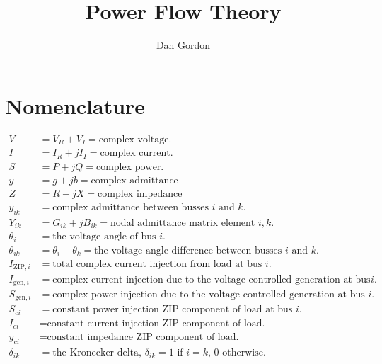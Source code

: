 \documentclass[11pt]{article}
\title{Power Flow Theory}
\author{Dan Gordon}
\date{}
\newcommand{\Vr}{{V_R}}
\newcommand{\Vi}{{V_I}}
\newcommand{\Ir}{{I_R}}
\newcommand{\Ii}{{I_I}}
\begin{document}
\maketitle

\section{Nomenclature}
\begin{align*}
V &= \Vr + \Vi = \text{complex voltage.} \\
I &= \Ir + j\Ii = \text{complex current.} \\
S &= P + jQ = \text{complex power.} \\
y &= g + jb = \text{complex admittance} \\
Z &= R + jX = \text{complex impedance} \\
y_{ik} &= \text{complex admittance between busses $i$ and $k$.} \\
Y_{ik} &= G_{ik} + jB_{ik} = \text{nodal admittance matrix element $i, k$.} \\
\theta_{i} &= \text{the voltage angle of bus $i$.} \\
\theta_{ik} &= \theta_i - \theta_k = \text{the voltage angle difference between busses $i$ and $k$.} \\
I_{\text{ZIP},i} &= \text{total complex current injection from load at bus $i$.} \\
I_{\text{gen},i} &= \text{complex current injection due to the voltage controlled generation at bus $i$.} \\
S_{\text{gen},i} &= \text{complex power injection due to the voltage controlled generation at bus $i$.} \\
S_{ci} &= \text{constant power injection ZIP component of load at bus $i$.} \\
I_{ci} &= \text{constant current injection ZIP component of load.} \\
y_{ci} &= \text{constant impedance ZIP component of load.} \\
\delta_{ik} &= \text{the Kronecker delta, $\delta_{ik} = 1$ if $i = k$, 0 otherwise.}
\end{align*}
\end{document}
